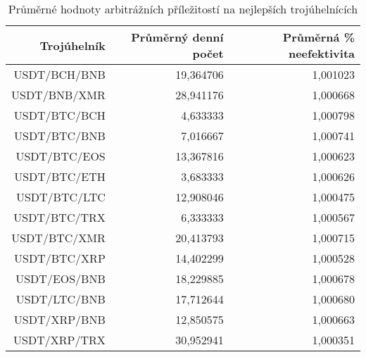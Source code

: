 \begin{table}\centering
\caption{Průměrné hodnoty arbitrážních příležitostí na nejlepších trojúhelnících}
\label{table_averages_best}
\begin{tabular}{|| r | r | r ||}\hline Trojúhelník & Průměrný denní počet & Průměrná \% neefektivita\\
 \hline\hline USDT/BCH/BNB & 19,364706 & 1,001023\\ 
 \hline USDT/BNB/XMR & 28,941176 & 1,000668\\ 
 \hline USDT/BTC/BCH & 4,633333 & 1,000798\\ 
 \hline USDT/BTC/BNB & 7,016667 & 1,000741\\ 
 \hline USDT/BTC/EOS & 13,367816 & 1,000623\\ 
 \hline USDT/BTC/ETH & 3,683333 & 1,000626\\ 
 \hline USDT/BTC/LTC & 12,908046 & 1,000475\\ 
 \hline USDT/BTC/TRX & 6,333333 & 1,000567\\ 
 \hline USDT/BTC/XMR & 20,413793 & 1,000715\\ 
 \hline USDT/BTC/XRP & 14,402299 & 1,000528\\ 
 \hline USDT/EOS/BNB & 18,229885 & 1,000678\\ 
 \hline USDT/LTC/BNB & 17,712644 & 1,000680\\ 
 \hline USDT/XRP/BNB & 12,850575 & 1,000663\\ 
 \hline USDT/XRP/TRX & 30,952941 & 1,000351\\ 
 \hline
\end{tabular}
\end{table}